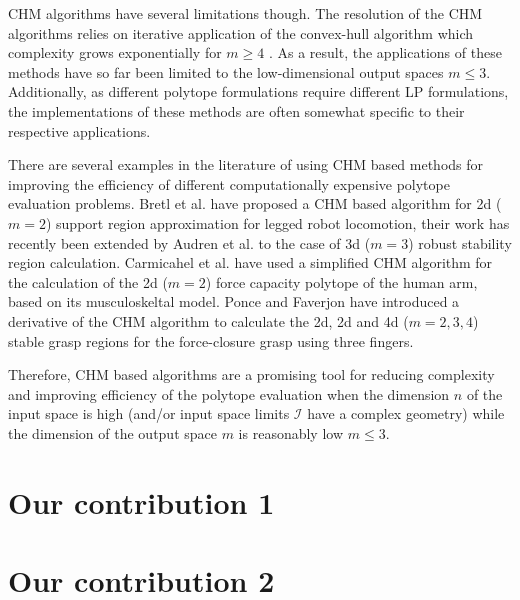 CHM algorithms have several limitations though. The resolution of the CHM algorithms relies on iterative application of the convex-hull algorithm which complexity grows exponentially for $m \geq 4$ \cite{Barber1996}. As a result, the applications of these methods have so far been limited to the low-dimensional output spaces $m\leq3$. Additionally, as different polytope formulations require different LP formulations, the implementations of these methods are often somewhat specific to their respective applications. 

There are several examples in the literature of using CHM based methods for improving the efficiency of different computationally expensive polytope evaluation problems. Bretl et al. \cite{Bretl2008} have proposed a CHM based algorithm for 2d ($m\!=2\!$) support region approximation for legged robot locomotion, their work has recently been extended by Audren et al. \cite{Herve2018} to the case of 3d ($m\!=3\!$) robust stability region calculation. Carmicahel et al. \cite{carmichael2011Towards, carmichael_estimating_2013} have used a simplified CHM algorithm for the calculation of the 2d ($m\!=2\!$) force capacity polytope of the human arm, based on its musculoskeltal model. Ponce and Faverjon \cite{Ponce1995} have introduced a derivative of the CHM algorithm to calculate the 2d, 2d and 4d ($m\!=2,3,4\!$) stable grasp regions for the force-closure grasp using three fingers. 

Therefore, CHM based algorithms are a promising tool for reducing complexity and improving efficiency of the polytope evaluation when the dimension $n$ of the input space is high (and/or input space limits $\mathcal{I}$ have a complex geometry) while the dimension of the output space $m$ is reasonably low $m\leq3$.

\chapter{Our contribution 1}
\chapter{Our contribution 2}

